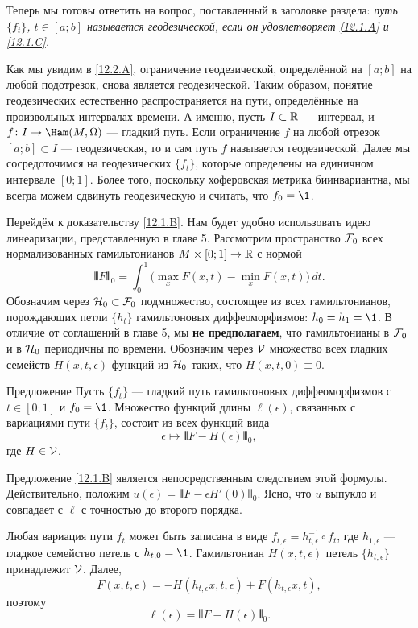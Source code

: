Теперь мы готовы ответить на вопрос, поставленный в заголовке раздела:
\emph{путь $\{f_t\}$, $t\in[a; b]$ называется
  геодезической, если он удовлетворяет \ref{12.1.A} и \ref{12.1.C}.} 

Как мы увидим в \ref{12.2.A}, ограничение геодезической, определённой
на $[a; b]$ на любой подотрезок, снова является геодезической. 
Таким образом, понятие геодезических естественно распространяется на пути, определённые на произвольных интервалах времени. 
А именно, пусть $I\subset \mathbb{R}$ — интервал, и $f\: I\to\Ham(M,\Omega)$ — гладкий путь.
Если ограничение $f$ на любой отрезок $[a; b] \subset I$ —
геодезическая, то и сам путь $f$ называется геодезической. 
Далее мы сосредоточимся на геодезических $\{f_t\}$, которые определены
на единичном интервале $[0; 1]$. 
Более того, поскольку хоферовская метрика биинвариантна, мы всегда
можем сдвинуть геодезическую и считать, что $f_0 = \1$.  

Перейдём к доказательству \ref{12.1.B}.
Нам будет удобно использовать идею линеаризации, представленную в главе 5.
Рассмотрим пространство $\mathcal{F}_0$ всех
нормализованных гамильтонианов $M \times [0; 1] \to \mathbb{R}$ с нормой
\[\VERT F \VERT_0 = \int_0^1 \big(\max_x F(x,t) - \min_x F(x,t)\big)\, dt.\]
Обозначим через $\mathcal{H}_0 \subset \mathcal{F}_0$ подмножество,
состоящее из всех гамильтонианов, порождающих петли $\{h_t\}$
гамильтоновых диффеоморфизмов: $h_0 = h_1 = \1$.
В отличие от соглашений в главе 5,
мы \textbf{не предполагаем}, что гамильтонианы в $\mathcal{F}_0$ и в $\mathcal{H}_0$
периодичны по времени. 
Обозначим через \index[symb]{$\V$}$\V$ множество всех гладких семейств
$H(x, t, \epsilon)$ функций из $\mathcal{H}_0$ таких, что $H(x, t, 0) \equiv
0$. 

\begin{thm}{Предложение}\label{12.1.E}
Пусть $\{f_t\}$ — гладкий путь гамильтоновых диффеоморфизмов с $t
\in [0; 1]$ и $f_0 = \1$. 
Множество функций длины $\ell(\epsilon)$, связанных с вариациями пути $\{f_t\}$, состоит из всех функций вида 
\[\epsilon\mapsto\VERT F - H(\epsilon)\VERT_0,\]
где $H\in\mathcal{V}$.
\end{thm}

Предложение \ref{12.1.B} является непосредственным следствием этой формулы.
Действительно, положим $u(\epsilon) = \VERT F - \epsilon H'(0)\VERT_0$.
Ясно, что $u$ выпукло и совпадает с $\ell$ с точностью до второго порядка.

Любая вариация пути $f_t$ может быть записана в виде $f_{t,\epsilon} = h_{t,\epsilon}^{-1}\circ f_t$, где $h_{1,\epsilon}$ — гладкое семейство петель с $h_{t,0} = \1$.
Гамильтониан $H(x,t,\epsilon)$ петель $\{h_{t,\epsilon}\}$ принадлежит $\V$.
Далее, 
\[F(x, t, \epsilon) = -H(h_{t,\epsilon}x, t, \epsilon) + F(h_{t,\epsilon}x, t),\]
поэтому
\[\ell(\epsilon) = \VERT F - H(\epsilon)\VERT_0.\]
\qeds

